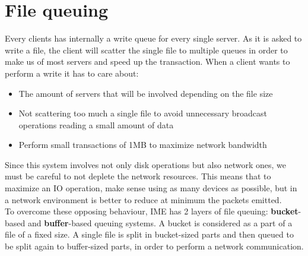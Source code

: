 \section{File queuing}
Every clients has internally a write queue for every single server. As it is
asked to write a file, the client will scatter the single file to multiple
queues in order to make us of most servers and speed up the transaction.
When a client wants to perform a write it has to care about:
\begin{itemize}
    \item The amount of servers that will be involved depending on the file size
    \item Not scattering too much a single file to avoid unnecessary broadcast
        operations reading a small amount of data
    \item Perform small transactions of 1MB to maximize network bandwidth
\end{itemize}
Since this system involves not only disk operations but also network ones, we
must be careful to not deplete the network resources. This means that to
maximize an IO operation, make sense using as many devices as possible, but in
a network environment is better to reduce at minimum the packets emitted. \\ To
overcome these opposing behaviour, IME has 2 layers of file queuing:
\textbf{bucket}-based and \textbf{buffer}-based queuing systems.  A bucket is
considered as a part of a file of a fixed size. A single file is split in
bucket-sized parts and then queued to be split again to buffer-sized parts, in
order to perform a network communication.

